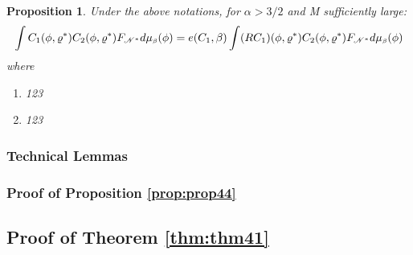 \documentclass[11pt,reqno]{article}
\newtheorem{prop}[thm]{Proposition}
\theoremstyle{definition}
\begin{document}
\begin{prop} \label{prop:prop44}
Under the above notations, for $\alpha > 3/2$ and M sufficiently large:
$$
\int C_1(\phi, \varrho^*) C_2(\phi, \varrho^*) F_{\mathscr{N}^*}d\mu_{\text{\tiny$\beta$}}(\phi) = 
e(C_1, \beta) \int (RC_1)(\phi, \varrho^*) C_2(\phi, \varrho^*) F_{\mathscr{N}^*}d\mu_{\text{\tiny$\beta$}}(\phi)
$$
where
\begin{enumerate}[label={\alph*)}]
\item 123
\item 123
\end{enumerate}
\end{prop}
\subsubsection{Technical Lemmas}
\subsubsection{Proof of Proposition \eqref{prop:prop44}}

\subsection{Proof of Theorem \eqref{thm:thm41}}
\end{document}
